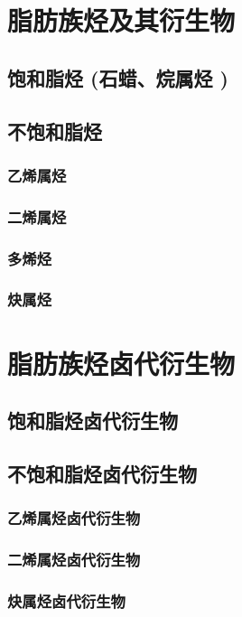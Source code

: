 \documentclass[UTF8]{../03-Chemistry}
\begin{document}
\section{脂肪族烃及其衍生物}
    \subsection{饱和脂烃 (石蜡、烷属烃 )}
    \subsection{不饱和脂烃}
        \subsubsection{乙烯属烃}
        \subsubsection{二烯属烃}
        \subsubsection{多烯烃}
        \subsubsection{炔属烃}

\section{脂肪族烃卤代衍生物}
    \subsection{饱和脂烃卤代衍生物}
    \subsection{不饱和脂烃卤代衍生物}
        \subsubsection{乙烯属烃卤代衍生物}
        \subsubsection{二烯属烃卤代衍生物}
        \subsubsection{炔属烃卤代衍生物}
\end{document}
